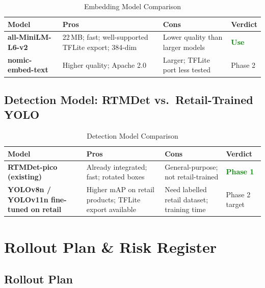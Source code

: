 \documentclass[11pt,a4paper]{article}
\begin{document}
\begin{table}[h!]
\centering
\renewcommand{\arraystretch}{1.3}
\begin{tabularx}{\textwidth}{L{3.5cm} L{3.5cm} L{3.5cm} C{2cm}}
\toprule
\textbf{Model} & \textbf{Pros} & \textbf{Cons} & \textbf{Verdict} \\
\midrule
\textbf{all-MiniLM-L6-v2}
  & 22\,MB; fast; well-supported TFLite export; 384-dim
  & Lower quality than larger models
  & \textcolor{green}{\textbf{Use}} \\
\midrule
\textbf{nomic-embed-text}
  & Higher quality; Apache 2.0
  & Larger; TFLite port less tested
  & Phase 2 \\
\bottomrule
\end{tabularx}
\caption{Embedding Model Comparison}
\end{table}

\subsection{Detection Model: RTMDet vs.\ Retail-Trained YOLO}

\begin{table}[h!]
\centering
\renewcommand{\arraystretch}{1.3}
\begin{tabularx}{\textwidth}{L{3.5cm} L{3.5cm} L{3.5cm} C{2cm}}
\toprule
\textbf{Model} & \textbf{Pros} & \textbf{Cons} & \textbf{Verdict} \\
\midrule
\textbf{RTMDet-pico (existing)}
  & Already integrated; fast; rotated boxes
  & General-purpose; not retail-trained
  & \textcolor{green}{\textbf{Phase 1}} \\
\midrule
\textbf{YOLOv8n / YOLOv11n fine-tuned on retail}
  & Higher mAP on retail products; TFLite export available
  & Need labelled retail dataset; training time
  & Phase 2 target \\
\bottomrule
\end{tabularx}
\caption{Detection Model Comparison}
\end{table}

\section{Rollout Plan \& Risk Register}

\subsection{Rollout Plan}
\end{document}

